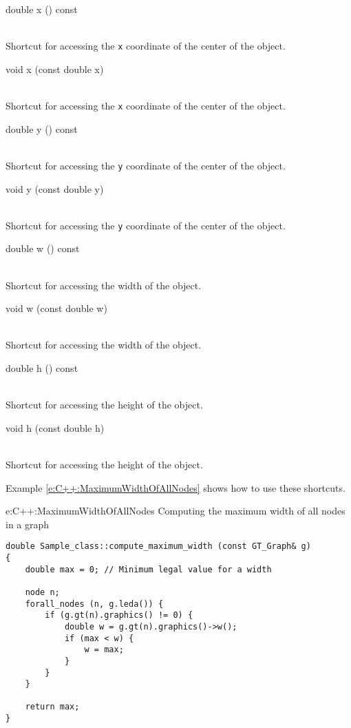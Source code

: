 \documentclass[twoside,fleqn]{report}
\begin{document}
\begin{Cdefinition}
  
  \item[double x () const] \strut\\
  Shortcut for accessing the \texttt{x} coordinate of the center of 
  the object.
  
  \item[void x (const double x)]  \strut\\
  Shortcut for accessing the \texttt{x} coordinate of the center of 
  the object.
  
  \item[double y () const] \strut\\
  Shortcut for accessing the \texttt{y} coordinate of the center of 
  the object.

  \item[void y (const double y)] \strut\\
  Shortcut for accessing the \texttt{y} coordinate of the center of 
  the object.
  
  \item[double w () const] \strut\\
  Shortcut for accessing the width of the object.

  \item[void w (const double w)] \strut\\
  Shortcut for accessing the width of the object.
  
  \item[double h () const] \strut\\
  Shortcut for accessing the height of the object.

  \item[void h (const double h)] \strut\\
  Shortcut for accessing the height of the object.
  
\end{Cdefinition}

Example \ref{e:C++:MaximumWidthOfAllNodes} shows how to use these 
shortcuts.

\begin{example}%
{e:C++:MaximumWidthOfAllNodes}%
{Computing the maximum width of all nodes in a graph}
\begin{verbatim}
double Sample_class::compute_maximum_width (const GT_Graph& g)
{
    double max = 0; // Minimum legal value for a width
    
    node n;
    forall_nodes (n, g.leda()) {
        if (g.gt(n).graphics() != 0) {
            double w = g.gt(n).graphics()->w();
            if (max < w) {
                w = max;
            }
        }
    }
    
    return max;
}
\end{verbatim}
\end{example}
\end{document}
